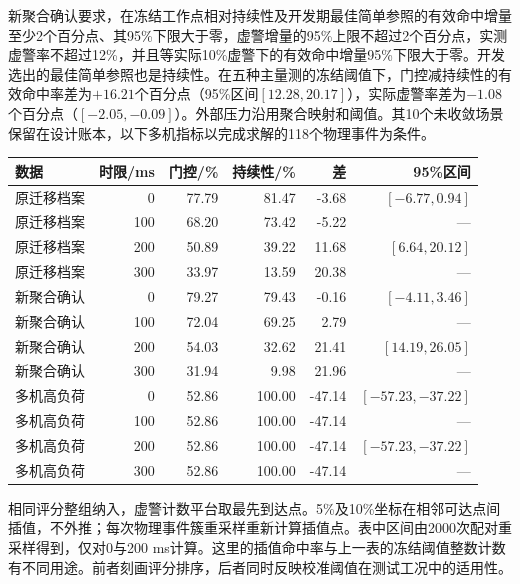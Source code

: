 \documentclass[UTF8,a4paper,11pt]{ctexart}
\begin{document}
\clearpage
新聚合确认要求，在冻结工作点相对持续性及开发期最佳简单参照的有效命中增量至少2个百分点、其95\%下限大于零，虚警增量的95\%上限不超过2个百分点，实测虚警率不超过12\%，并且等实际10\%虚警下的有效命中增量95\%下限大于零。开发选出的最佳简单参照也是持续性。在五种主量测的冻结阈值下，门控减持续性的有效命中率差为$+16.21$个百分点（95\%区间$[12.28,20.17]$），实际虚警率差为$-1.08$个百分点（$[-2.05,-0.09]$）。外部压力沿用聚合映射和阈值。其10个未收敛场景保留在设计账本，以下多机指标以完成求解的118个物理事件为条件。

\begin{center}\small\setlength{\tabcolsep}{4pt}
\label{tab:roc-new}
\begin{tabular}{lrrrrr}\toprule
数据 & 时限/ms & 门控/\% & 持续性/\% & 差 & 95\%区间 \\ \midrule
原迁移档案 & 0 & 77.79 & 81.47 & -3.68 & $[-6.77, 0.94]$ \\
原迁移档案 & 100 & 68.20 & 73.42 & -5.22 & — \\
原迁移档案 & 200 & 50.89 & 39.22 & 11.68 & $[6.64, 20.12]$ \\
原迁移档案 & 300 & 33.97 & 13.59 & 20.38 & — \\
新聚合确认 & 0 & 79.27 & 79.43 & -0.16 & $[-4.11, 3.46]$ \\
新聚合确认 & 100 & 72.04 & 69.25 & 2.79 & — \\
新聚合确认 & 200 & 54.03 & 32.62 & 21.41 & $[14.19, 26.05]$ \\
新聚合确认 & 300 & 31.94 & 9.98 & 21.96 & — \\
多机高负荷 & 0 & 52.86 & 100.00 & -47.14 & $[-57.23, -37.22]$ \\
多机高负荷 & 100 & 52.86 & 100.00 & -47.14 & — \\
多机高负荷 & 200 & 52.86 & 100.00 & -47.14 & $[-57.23, -37.22]$ \\
多机高负荷 & 300 & 52.86 & 100.00 & -47.14 & — \\
\bottomrule\end{tabular}\end{center}

相同评分整组纳入，虚警计数平台取最先到达点。5\%及10\%坐标在相邻可达点间插值，不外推；每次物理事件簇重采样重新计算插值点。表中区间由2000次配对重采样得到，仅对0与200 ms计算。这里的插值命中率与上一表的冻结阈值整数计数有不同用途。前者刻画评分排序，后者同时反映校准阈值在测试工况中的适用性。
\end{document}
